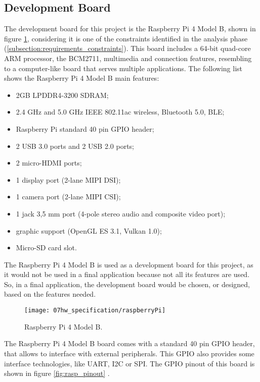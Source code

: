 \subsection{Development Board}

The development board for this project is the Raspberry Pi 4 Model B, shown in figure \ref{fig:rasp}, considering it is one of the constraints identified in the analysis phase (\ref{subsection:requirements_constraints}). This board includes a 64-bit quad-core ARM processor, the BCM2711, multimedia and connection features, resembling to a computer-like board that serves multiple applications. The following list shows the Raspberry Pi 4 Model B main features:

\begin{itemize}
        \item 2GB LPDDR4-3200 SDRAM;
        \item 2.4 GHz and 5.0 GHz IEEE 802.11ac wireless, Bluetooth 5.0, BLE;
        \item Raspberry Pi standard 40 pin GPIO header;   
        \item 2 USB 3.0 ports and 2 USB 2.0 ports;
        \item 2 micro-HDMI ports;
        \item 1 display port (2-lane MIPI DSI);
        \item 1 camera port (2-lane MIPI CSI);
        \item 1 jack 3,5 mm port (4-pole stereo audio and composite video port);
		\item graphic support (OpenGL ES 3.1, Vulkan 1.0);
		\item Micro-SD card slot.
\end{itemize}

The Raspberry Pi 4 Model B is used as a development board for this project, as it would not be used in a final application because not all its features are used. So, in a final application, the development board would be chosen, or designed, based on the features needed.

\begin{figure}[H]
	\centering
	\texttt{[image: 07hw\_specification/raspberryPi]}
	\caption{Raspberry Pi 4 Model B.}
	\label{fig:rasp}
\end{figure}


The Raspberry Pi 4 Model B board comes with a standard 40 pin GPIO header, that allows to interface with external peripherals. This GPIO also provides some interface technologies, like UART, I2C or SPI. The GPIO pinout of this board is shown in figure \ref{fig:rasp_pinout} \cite{pinout}.

